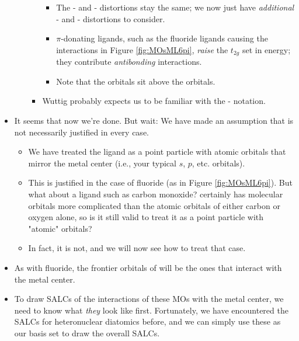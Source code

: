\documentclass[../notes.tex]{subfiles}
\begin{document}
\begin{itemize}
\begin{enumerate}
\begin{itemize}
            \begin{itemize}
                \item The - and - distortions stay the same; we now just have \emph{additional} - and - distortions to consider.
                \item $\pi$-donating ligands, such as the fluoride ligands causing the interactions in Figure \ref{fig:MOsML6pi}, \emph{raise} the $t_{2g}$ set in energy; they contribute \emph{antibonding} interactions.
                \item Note that the  orbitals sit above the  orbitals.
            \end{itemize}
            \item Wuttig probably expects us to be familiar with the - notation.
        \end{itemize}
    \end{enumerate}
    \item It seems that now we're done. But wait: We have made an assumption that is not necessarily justified in every case.
    \begin{itemize}
        \item We have treated the ligand as a point particle with atomic orbitals that mirror the metal center (i.e., your typical $s$, $p$, etc. orbitals).
        \item This is justified in the case of fluoride (as in Figure \ref{fig:MOsML6pi}). But what about a ligand such as carbon monoxide?  certainly has molecular orbitals more complicated than the atomic orbitals of either carbon or oxygen alone, so is it still valid to treat it as a point particle with "atomic" orbitals?
        \item In fact, it is not, and we will now see how to treat that case.
    \end{itemize}
    \item As with fluoride, the frontier orbitals of  will be the ones that interact with the metal center.
    \item To draw SALCs of the interactions of these MOs with the metal center, we need to know what \emph{they} look like first. Fortunately, we have encountered the SALCs for heteronuclear diatomics before, and we can simply use these as our basis set to draw the overall SALCs.
    \begin{figure}[h!]
        \centering
        \begin{subfigure}[b]{0.24\linewidth}

\end{subfigure}
\end{figure}
\end{itemize}
\end{document}
